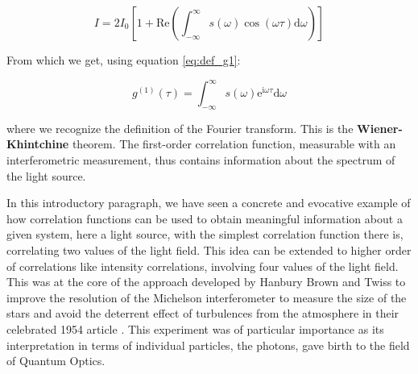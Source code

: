 \begin{equation}
    I=2 I_{0}\left[1+\mathrm{Re} \left(\int_{-\infty}^{\infty} s(\omega) \cos (\omega \tau) \mathrm{d} \omega\right)\right]
\end{equation}

\noindent From which we get, using equation \ref{eq:def_g1}:

\begin{equation}
    g^{(1)}(\tau)=\int_{-\infty}^{\infty} s(\omega) \mathrm{e}^{\mathrm{i} \omega \tau} \mathrm{d} \omega
\end{equation}

\noindent where we recognize the definition of the Fourier transform. This is the \textbf{Wiener-Khintchine} theorem. The first-order correlation function, measurable with an interferometric measurement, thus contains information about the spectrum of the light source. 




In this introductory paragraph, we have seen a concrete and evocative example of how correlation functions can be used to obtain meaningful information about a given system, here a light source, with the simplest correlation function there is, correlating two values of the light field. This idea can be extended to higher order of correlations like intensity correlations, involving four values of the light field. This was at the core of the approach developed by Hanbury Brown and Twiss to improve the resolution of the Michelson interferometer to measure the size of the stars and avoid the deterrent effect of turbulences from the atmosphere in their celebrated 1954 article \cite{brown1954lxxiv}. This experiment was of particular importance as its interpretation in terms of individual particles, the photons, gave birth to the field of Quantum Optics. 






